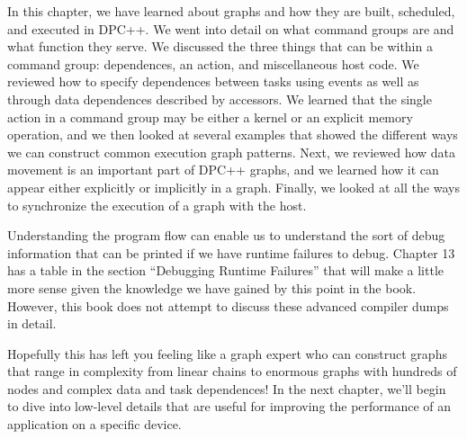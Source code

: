 In this chapter, we have learned about graphs and how they are built, scheduled, and executed in DPC++. We went into detail on what command groups are and what function they serve. We discussed the three things that can be within a command group: dependences, an action, and miscellaneous host code. We reviewed how to specify dependences between tasks using events as well as through data dependences described by accessors. We learned that the single action in a command group may be either a kernel or an explicit memory operation, and we then looked at several examples that showed the different ways we can construct common execution graph patterns. Next, we reviewed how data movement is an important part of DPC++ graphs, and we learned how it can appear either explicitly or implicitly in a graph. Finally, we looked at all the ways to synchronize the execution of a graph with the host.\par

Understanding the program flow can enable us to understand the sort of debug information that can be printed if we have runtime failures to debug. Chapter 13 has a table in the section “Debugging Runtime Failures” that will make a little more sense given the knowledge we have gained by this point in the book. However, this book does not attempt to discuss these advanced compiler dumps in detail.\par

Hopefully this has left you feeling like a graph expert who can construct graphs that range in complexity from linear chains to enormous graphs with hundreds of nodes and complex data and task dependences! In the next chapter, we’ll begin to dive into low-level details that are useful for improving the performance of an application on a specific device.\par


\newpage







